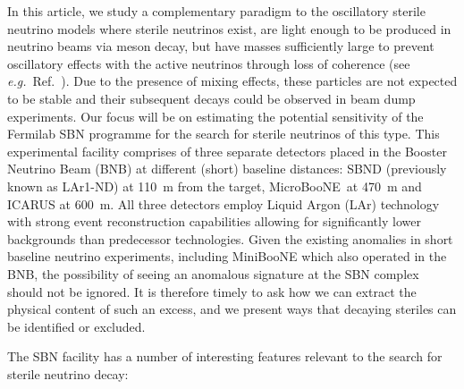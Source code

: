 \documentclass[11pt, a4paper]{article}
\newcommand{\refref}[1]{Ref.~\cite{#1}}
\def\eg{\emph{e.g.}}
\def\muboone{MicroBooNE}
\begin{document}
In this article, we study a complementary paradigm to the oscillatory sterile
neutrino models where sterile neutrinos exist, are light enough to be produced
in neutrino beams via meson decay, but have masses sufficiently large to
prevent oscillatory effects with the active neutrinos through loss of coherence
(see \eg\ \refref{Akhmedov:2009rb}). Due to the presence of mixing effects,
these particles are not expected to be stable and their subsequent decays could
be observed in beam dump experiments. 
%
%
Our focus will be on estimating the potential sensitivity of the Fermilab SBN
programme \cite{Antonello:2015lea} for the search for sterile neutrinos of this
type. 
%
This experimental facility comprises of three separate detectors placed in the
Booster Neutrino Beam (BNB) at different (short) baseline distances: SBND
(previously known as LAr1-ND) at 110~m from the target, \muboone\ at 470~m and
ICARUS at 600~m.  All three detectors employ Liquid Argon (LAr) technology with
strong event reconstruction capabilities allowing for significantly lower
backgrounds than predecessor technologies. 
%
%
Given the existing anomalies in short baseline neutrino experiments, including
MiniBooNE which also operated in the BNB, the possibility of seeing an
anomalous signature at the SBN complex should not be ignored. It is therefore
timely to ask how we can extract the physical content of such an excess, and we
present ways that decaying steriles can be identified or excluded.

The SBN facility has a number of interesting features relevant to the search
for sterile neutrino decay:
\end{document}
